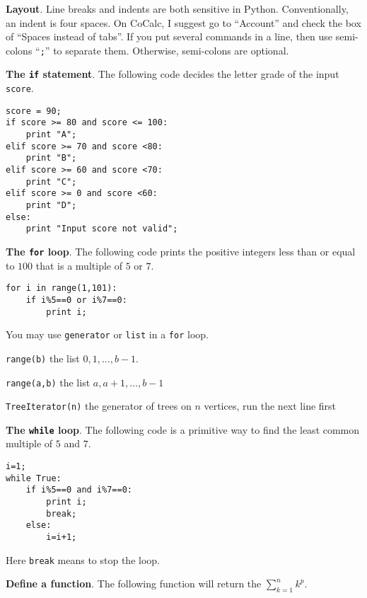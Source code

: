 \documentclass{article}
\newcommand{\heading}[1]{\medskip\textbf{#1}.}
\newenvironment{lwdes}{\begin{description}[leftmargin=1.7cm,align=left,labelwidth=1.5cm]}{\end{description}}
\begin{document}
\begin{multicols}{2}
\heading{Layout}  Line breaks and indents are both sensitive in Python.  Conventionally, an indent is four spaces.  On CoCalc, I suggest go to ``Account'' and check the box of ``Spaces instead of tabs''.  If you put several commands in a line, then use semi-colons ``\texttt{;}'' to separate them.  Otherwise, semi-colons are optional.

\heading{The \texttt{if} statement}  The following code decides the letter grade of the input \texttt{score}.

\begin{verbatim}
score = 90;
if score >= 80 and score <= 100:
    print "A";
elif score >= 70 and score <80:
    print "B";
elif score >= 60 and score <70:
    print "C";
elif score >= 0 and score <60:
    print "D";
else:
    print "Input score not valid";
\end{verbatim}

\heading{The \texttt{for} loop}  The following code prints the positive integers less than or equal to $100$ that is a multiple of $5$ or $7$.

\begin{verbatim}
for i in range(1,101):
    if i%5==0 or i%7==0:
        print i;
\end{verbatim}

You may use \texttt{generator} or \texttt{list} in a \texttt{for} loop.
\begin{lwdes}
\item[\texttt{range(b)}] the list $0,1,\ldots,b-1$.
\item[\texttt{range(a,b)}] the list $a,a+1,\ldots,b-1$
\item[\texttt{TreeIterator(n)}] the generator of trees on $n$ vertices, run the next line first\\
\end{lwdes}

\heading{The \texttt{while} loop}  The following code is a primitive way to find the least common multiple of $5$ and $7$.

\begin{verbatim}
i=1;
while True:
    if i%5==0 and i%7==0:
        print i;
        break;
    else:
        i=i+1;
\end{verbatim}

Here \texttt{break} means to stop the loop.

\heading{Define a function}  The following function will return  the $\sum_{k=1}^n k^p$.


\end{multicols}
\end{document}
